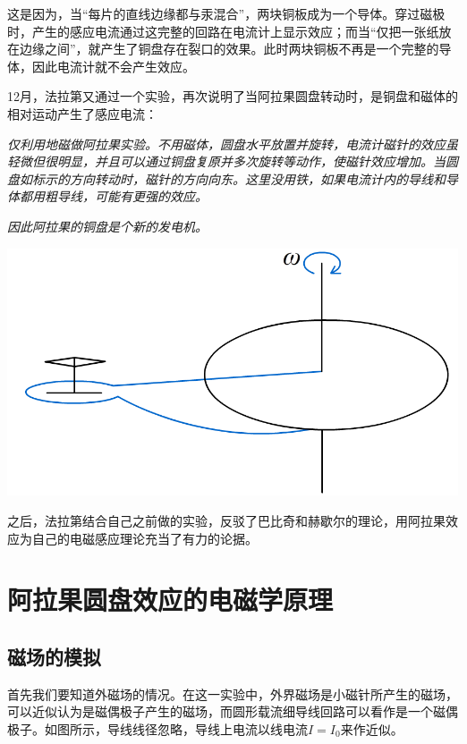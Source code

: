 \documentclass{CLGPY}
\begin{document}
\begin{multicols}{1}
        这是因为，当“每片的直线边缘都与汞混合”，两块铜板成为一个导体。穿过磁极时，产生的感应电流通过这完整的回路在电流计上显示效应；而当“仅把一张纸放在边缘之间”，就产生了铜盘存在裂口的效果。此时两块铜板不再是一个完整的导体，因此电流计就不会产生效应。

        12月，法拉第又通过一个实验，再次说明了当阿拉果圆盘转动时，是铜盘和磁体的相对运动产生了感应电流：


        \emph{仅利用地磁做阿拉果实验。不用磁体，圆盘水平放置并旋转，电流计磁针的效应虽轻微但很明显，并且可以通过铜盘复原并多次旋转等动作，使磁针效应增加。当圆盘如标示的方向转动时，磁针的方向向东。这里没用铁，如果电流计内的导线和导体都用粗导线，可能有更强的效应。}

\emph{因此阿拉果的铜盘是个新的发电机。}
        \begin{center}
            \includegraphics[scale=.18]{./fig/20210615111946.png}
        \end{center}

之后，法拉第结合自己之前做的实验，反驳了巴比奇和赫歇尔的理论，用阿拉果效应为自己的电磁感应理论充当了有力的论据。




     \section{阿拉果圆盘效应的电磁学原理}
     \subsection{磁场的模拟}
首先我们要知道外磁场的情况。在这一实验中，外界磁场是小磁针所产生的磁场，可以近似认为是磁偶极子产生的磁场，而圆形载流细导线回路可以看作是一个磁偶极子。如图所示，导线线径忽略，导线上电流以线电流$I=I_0$来作近似。


\end{multicols}
\end{document}

